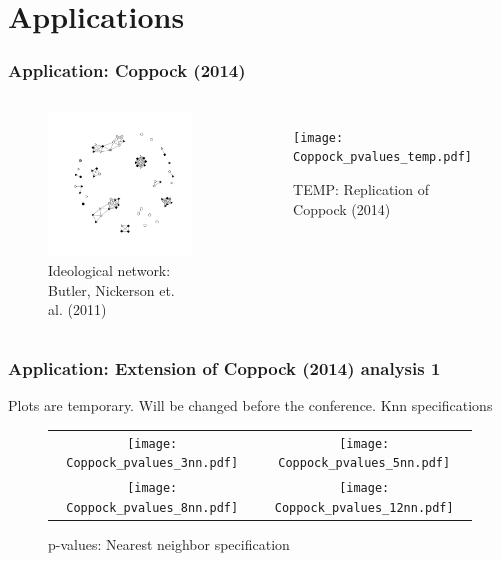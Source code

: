 \documentclass{beamer}
\begin{document}
\section{Applications}

\begin{frame}
\frametitle{Application: Coppock (2014)}
\begin{columns}[c]

\begin{figure}
\centering
\includegraphics[scale=0.3]{Coppock_ideological_net.pdf}
\caption{Ideological network: Butler, Nickerson et. al. (2011)}
\end{figure}

\begin{figure}
\centering
\texttt{[image: Coppock\_pvalues\_temp.pdf]}
\caption{TEMP: Replication of Coppock (2014)}
\end{figure}

\end{columns}
\end{frame}


\begin{frame}
\frametitle{Application: Extension of Coppock (2014) analysis 1}
Plots are temporary. Will be changed before the conference. Knn specifications
	\begin{figure}
	\centering
	\begin{tabular}{cc}
	\texttt{[image: Coppock\_pvalues\_3nn.pdf]} &
	\texttt{[image: Coppock\_pvalues\_5nn.pdf]} \\ 
	\texttt{[image: Coppock\_pvalues\_8nn.pdf]} &
	\texttt{[image: Coppock\_pvalues\_12nn.pdf]} \\ 
	\end{tabular}
	\caption{p-values: Nearest neighbor specification}
	\end{figure}
\end{frame}
\end{document}
